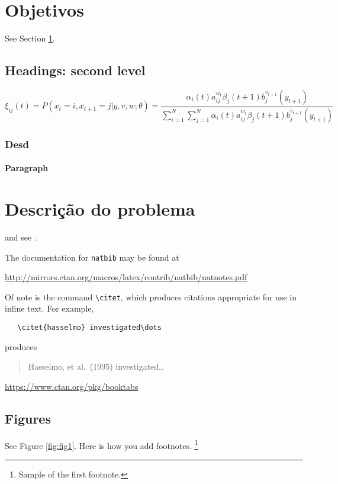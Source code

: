 \documentclass{article}
\begin{document}
\section{Objetivos}
\label{sec:headings}

\lipsum[4] See Section \ref{sec:headings}.

\subsection{Headings: second level}
\lipsum[5]
\begin{equation}
\xi _{ij}(t)=P(x_{t}=i,x_{t+1}=j|y,v,w;\theta)= {\frac {\alpha _{i}(t)a^{w_t}_{ij}\beta _{j}(t+1)b^{v_{t+1}}_{j}(y_{t+1})}{\sum _{i=1}^{N} \sum _{j=1}^{N} \alpha _{i}(t)a^{w_t}_{ij}\beta _{j}(t+1)b^{v_{t+1}}_{j}(y_{t+1})}}
\end{equation}

\subsubsection{Desd}
\lipsum[6]

\paragraph{Paragraph}
\lipsum[7]

\section{Descrição do problema}
\label{sec:others}
\lipsum[8] \cite{kour2014real,kour2014fast} and see \cite{hadash2018estimate}.

The documentation for \verb+natbib+ may be found at
\begin{center}
  \url{http://mirrors.ctan.org/macros/latex/contrib/natbib/natnotes.pdf}
\end{center}
Of note is the command \verb+\citet+, which produces citations
appropriate for use in inline text.  For example,
\begin{verbatim}
   \citet{hasselmo} investigated\dots
\end{verbatim}
produces
\begin{quote}
  Hasselmo, et al.\ (1995) investigated\dots
\end{quote}

\begin{center}
  \url{https://www.ctan.org/pkg/booktabs}
\end{center}


\subsection{Figures}
\lipsum[10] 
See Figure \ref{fig:fig1}. Here is how you add footnotes. \footnote{Sample of the first footnote.}
\lipsum[11] 
\end{document}
